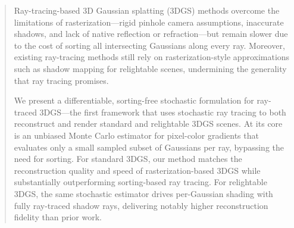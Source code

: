 \begin{abstract}
	Ray-tracing-based 3D Gaussian splatting (3DGS) methods overcome the limitations of rasterization---rigid pinhole camera assumptions, inaccurate shadows, and lack of native reflection or refraction---but remain slower due to the cost of sorting all intersecting Gaussians along every ray.
	Moreover, existing ray-tracing methods still rely on rasterization-style approximations such as shadow mapping for relightable scenes, undermining the generality that ray tracing promises.

	We present a differentiable, sorting-free stochastic formulation for ray-traced 3DGS---the first framework that uses stochastic ray tracing to both reconstruct and render standard and relightable 3DGS scenes.
	At its core is an unbiased Monte Carlo estimator for pixel-color gradients that evaluates only a small sampled subset of Gaussians per ray, bypassing the need for sorting.
	For standard 3DGS, our method matches the reconstruction quality and speed of rasterization-based 3DGS while substantially outperforming sorting-based ray tracing.
	For relightable 3DGS, the same stochastic estimator drives per-Gaussian shading with fully ray-traced shadow rays, delivering notably higher reconstruction fidelity than prior work.
\end{abstract}
